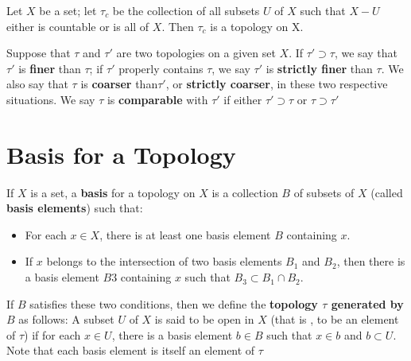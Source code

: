 \begin{exm}
		Let $X$ be a set; let $ \tau_c $ be the collection of all subsets $U$ of $X$ such that $ X - U$ either is countable or is all of $X$. Then $\tau_c$ is a topology on X.
\end{exm}

\begin{define}
	Suppose that $ \tau $ and $ \tau' $ are two topologies on a given set $X$. If $ \tau' \supset \tau $, we say that $ \tau' $ is \textbf{finer} than $ \tau$; if $\tau' $ properly contains $ \tau $, we say $ \tau'$ is \textbf{strictly finer} than $ \tau$. We also say that $ \tau $ is \textbf{coarser} than$ \tau' $, or \textbf{strictly coarser}, in these two respective situations. We say $ \tau $ is \textbf{comparable} with $ \tau' $ if either $ \tau' \supset \tau $ or $ \tau \supset \tau' $
\end{define}
\section*{Basis for a Topology}

\begin{define}
	If $X$ is a set, a \textbf{basis } for a topology on $X$ is a collection $ B$ of subsets of $X$ (called \textbf{basis elements}) such that:
	\begin{itemize}
		\item For each $x \in X $, there is at least one basis element $B$ containing $x$.
		\item If $x$ belongs to the intersection of two basis elements $B_1$ and $B_2$, then there is a basis element $B3$ containing $x$ such that $ B_3 \subset B_1 \cap B_2 $.
	\end{itemize}
	If $B$ satisfies these two conditions, then we define the \textbf{topology $\tau$ generated by $B$} as follows: A subset $U$ of $X$ is said to be open in $X$ (that is , to be an element of $ \tau$) if for each $x \in U$, there is a basis element $b \in B$ such that $ x \in b$ and $ b \subset U$. Note that each basis element is itself an element of $ \tau $
\end{define}
